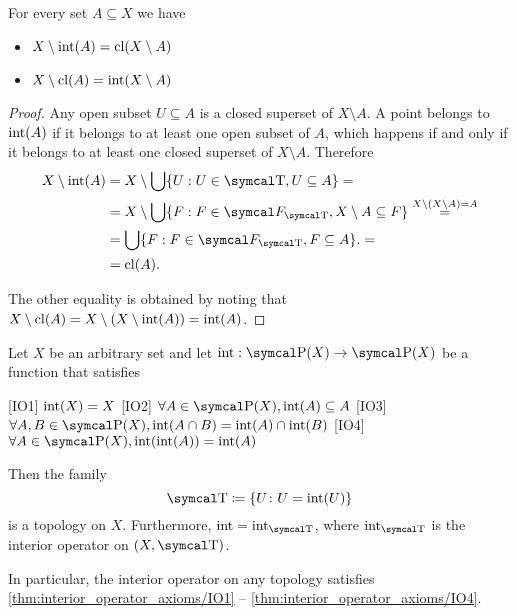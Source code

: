 \begin{proposition}\label{thm:interior_closure_complement} For every set \( A \subseteq X \) we have
  \begin{itemize}
    \item \( X \setminus \operatorname{int}(A) = \operatorname{cl}(X \setminus A) \)
    \item \( X \setminus \operatorname{cl}(A) = \operatorname{int}(X \setminus A) \)
  \end{itemize}
\end{proposition}
\begin{proof}
  Any open subset \( U \subseteq A \) is a closed superset of \( X \setminus A \). A point belongs to \( \operatorname{int}(A) \) if it belongs to at least one open subset of \( A \), which happens if and only if it belongs to at least one closed superset of \( X \setminus A \). Therefore
  \begin{align*}
    X \setminus \Int(A)
    &=
    X \setminus \bigcup \{ U : U \in \CT, U \subseteq A \}
    = \\ &=
    X \setminus \bigcup \{ F : F \in \Cal{F}_{\CT}, X \setminus A \subseteq F \}
    \overset {X \setminus (X \setminus A) = A} = \\ &=
    \bigcup \{ F : F \in \Cal{F}_{\CT}, F \subseteq A \}.
    = \\ &=
    \Cl(A).
  \end{align*}

  The other equality is obtained by noting that \( X \setminus \operatorname{cl}(A) = X \setminus (X \setminus \operatorname{int}(A)) = \operatorname{int}(A) \).
\end{proof}

\begin{proposition}\label{thm:interior_operator_axioms}
  Let \( X \) be an arbitrary set and let \( \Int: \Power(X) \to \Power(X) \) be a function that satisfies
  \begin{description}
    [IO1] \( \operatorname{int}(X) = X \)
    [IO2] \( \forall A \in \Power(X), \Int(A) \subseteq A \)
    [IO3] \( \forall A, B \in \Power(X), \Int(A \cap B) = \Int(A) \cap \Int(B) \)
    [IO4] \( \forall A \in \Power(X), \Int(\Int(A)) = \Int(A) \)
  \end{description}

  Then the family
  \begin{equation*}
    \CT \coloneqq \{ U \colon U = \Int(U) \}
  \end{equation*}
  is a topology on \( X \). Furthermore, \( \Int = \Int_{\CT} \), where \( \Int_{\CT} \) is the interior operator on \( (X, \CT) \).

  In particular, the interior operator on any topology satisfies \cref{thm:interior_operator_axioms/IO1} -- \cref{thm:interior_operator_axioms/IO4}.
\end{proposition}

